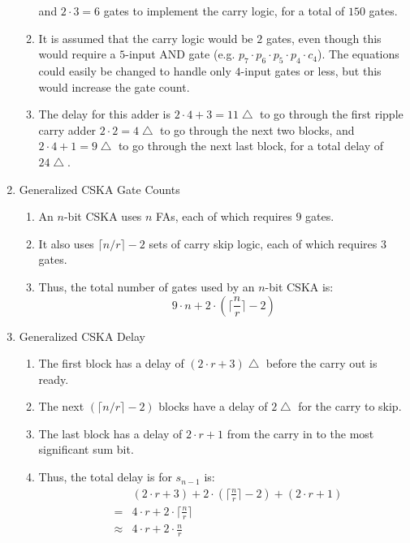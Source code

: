 \documentclass[times, twocolumn, 10pt]{article}
\begin{document}
\begin{enumerate}
\begin{enumerate}
    and $2 \cdot 3 = 6$ gates to implement the carry logic, for a total 
    of $150$ gates. 
  \item It is assumed that the carry logic would be $2$ gates, even though
  this would require a $5$-input AND gate (e.g. $p_7 \cdot p_6 \cdot p_5
  \cdot p_4 \cdot c_4$).  The equations could easily be changed to handle
  only $4$-input gates or less, but this would increase the gate count.
  \item The delay for this adder is $2 \cdot 4 + 3 = 11 \bigtriangleup$ to 
    go through the first ripple carry adder $2 \cdot 2 = 4 \bigtriangleup$ to
    go through the next two blocks, and $2 \cdot 4 + 1 = 9 \bigtriangleup$ 
    to go through the next last block, for a total delay of $24
    \bigtriangleup$. 
  \end{enumerate}
\item Generalized  CSKA Gate Counts
  \begin{enumerate}
  \item An $n$-bit CSKA uses $n$ FAs, each of which requires $9$ gates. 
  \item It also uses $\lceil n/r \rceil - 2$ sets of carry skip logic, each 
    of which requires $3$ gates. 
  \item Thus, the total number of gates used by an $n$-bit CSKA is:
    \begin{displaymath}
      9 \cdot n + 2 \cdot (\lceil \frac{n}{r} \rceil - 2)
    \end{displaymath}
  \end{enumerate}
\item Generalized  CSKA Delay
  \begin{enumerate}
  \item The first block has a delay of $(2 \cdot r + 3) \bigtriangleup$
  before the 
    carry out is ready. 
  \item The next $(\lceil n/r \rceil - 2)$ blocks have a delay of 
    $2 \bigtriangleup$  for the carry to skip. 
  \item The last block has a delay of $2 \cdot r + 1$ from the carry in to the 
    most significant sum bit. 
  \item Thus, the total delay is for $s_{n-1}$ is:
    \begin{eqnarray*}
      & & (2 \cdot r + 3)  + 2 \cdot (\lceil \frac{n}{r} \rceil - 2) + (2 \cdot
      r + 1) \\
      & = & 4 \cdot r + 2 \cdot \lceil \frac{n}{r} \rceil \\
      & \approx & 4 \cdot r + 2 \cdot \frac{n}{r}

\end{eqnarray*}
\end{enumerate}
\end{enumerate}
\end{document}
